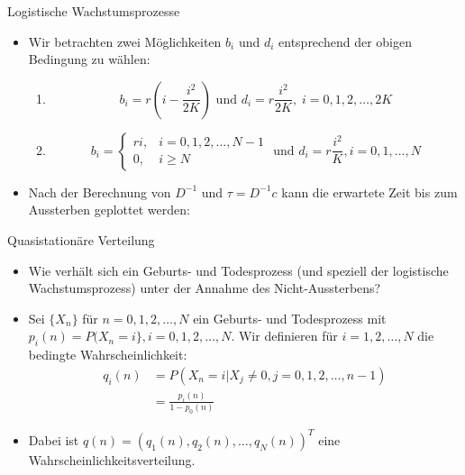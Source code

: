 \documentclass{beamer}
\begin{document}
\begin{frame}{Logistische Wachstumsprozesse}
  \begin{itemize}
  \item Wir betrachten zwei Möglichkeiten $b_i$ und $d_i$ entsprechend der obigen Bedingung zu wählen:
    \begin{enumerate}
    \item \[b_i = r(i - \frac{i^2}{2K}) \text{ und } d_i = r\frac{i^2}{2K}, \; i = 0,1,2,\dots,2K \]
    \item \[b_i = \begin{cases} ri,  &i = 0,1,2,\dots,N-1 \\ 0, &i \geq N \end{cases} \text{ und } d_i = r\frac{i^2}{K}, i = 0,1,\dots,N\]
    \end{enumerate}
  \item Nach der Berechnung von $D^{-1}$ und $τ = D^{-1}c$ kann die erwartete Zeit bis zum Aussterben geplottet werden:
  \end{itemize}
\end{frame}
\begin{frame}{Quasistationäre Verteilung}
  \begin{itemize}
  \item Wie verhält sich ein Geburts- und Todesprozess (und speziell der logistische Wachstumsprozess) unter der Annahme des Nicht-Aussterbens?
  \item Sei $\{X_n\}$ für $n = 0,1,2,\dots,N$ ein Geburts- und Todesprozess mit $p_i(n) = P(X_n=i\}, i = 0,1,2,\dots,N$. Wir definieren für $i = 1,2,\dots,N$ die bedingte Wahrscheinlichkeit:
    \begin{align*}
      q_i(n) &= P(X_n=i|X_j \neq 0, j = 0,1,2,\dots,n-1) \\
             &= \frac{p_i(n)}{1-p_0(n)}
    \end{align*}
  \item Dabei ist $q(n) = (q_1(n),q_2(n), \dots, q_N(n))^T$ eine Wahrscheinlichkeitsverteilung.
  \end{itemize}
\end{frame}
\end{document}
